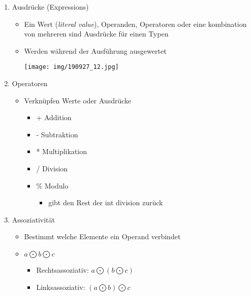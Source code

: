 \documentclass[11pt]{article}
\begin{document}
\begin{enumerate}
\item Ausdrücke (Expressions)
\label{sec:orgd675276}
\begin{itemize}
\item Ein Wert (\emph{literal value}), Operanden, Operatoren oder eine kombination von mehreren sind Ausdrücke für einen Typen\\
\item Werden während der Ausführung ausgewertet\\
\begin{center}
\texttt{[image: img/190927\_12.jpg]}
\end{center}
\end{itemize}

\item Operatoren
\label{sec:org9f35136}
\begin{itemize}
\item Verknüpfen Werte oder Ausdrücke\\
\begin{itemize}
\item + Addition\\
\item - Subtraktion\\
\item * Multiplikation\\
\item / Division\\
\item \% Modulo\\
\begin{itemize}
\item gibt den Rest der int division zurück\\
\end{itemize}
\end{itemize}
\end{itemize}

\item Assoziativität
\label{sec:orgfdc9a1d}
\begin{itemize}
\item Bestimmt welche Elemente ein Operand verbindet\\
\item \(a \bigodot b \bigodot c\)\\
\begin{itemize}
\item Rechtsassoziativ: \(a \bigodot (b \bigodot c)\)\\
\item Linksassoziativ: \((a \bigodot b) \bigodot c\)\\
\end{itemize}


\end{itemize}
\end{enumerate}
\end{document}
